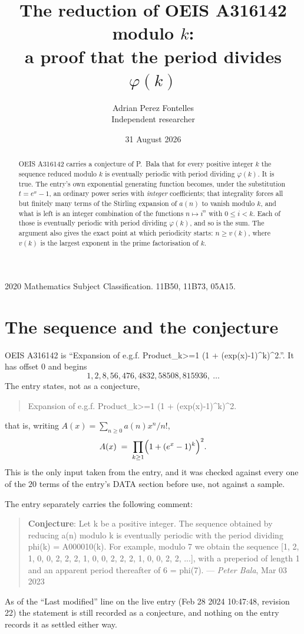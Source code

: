 \documentclass[11pt,a4paper]{article}
\title{The reduction of OEIS A316142 modulo $k$:\\ a proof that the period divides
$\varphi(k)$}
\author{Adrian Perez Fontelles\\ \small Independent researcher}
\date{31 August 2026}
\theoremstyle{plain}
\theoremstyle{definition}
\begin{document}
\maketitle

\begin{abstract}
OEIS A316142 carries a conjecture of P.~Bala that for every positive integer $k$ the
sequence reduced modulo $k$ is eventually periodic with period dividing $\varphi(k)$.
It is true. The entry's own exponential generating function becomes, under the
substitution $t=e^{x}-1$, an ordinary power series with \emph{integer} coefficients;
that integrality forces all but finitely many terms of the Stirling expansion of $a(n)$
to vanish modulo $k$, and what is left is an integer combination of the functions
$n\mapsto i^{n}$ with $0\le i<k$. Each of those is eventually periodic with period
dividing $\varphi(k)$, and so is the sum. The argument also gives the exact point at
which periodicity starts: $n\ge v(k)$, where $v(k)$ is the largest exponent in the
prime factorisation of $k$.
\end{abstract}

\noindent\small 2020 Mathematics Subject Classification. 11B50, 11B73, 05A15.\normalsize

\section{The sequence and the conjecture}

OEIS A316142 is ``Expansion of e.g.f. Product\_{k>=1} (1 + (exp(x)-1)\^{}k)\^{}2.''. It has offset $0$ and begins
\[
1, 2, 8, 56, 476, 4832, 58508, 815936,\ \dots
\]
The entry states, not as a conjecture,
\begin{quote}\small
Expansion of e.g.f. Product\_{k>=1} (1 + (exp(x)-1)\^{}k)\^{}2.
\end{quote}
that is, writing $A(x)=\sum_{n\ge 0}a(n)x^{n}/n!$,
\begin{equation}\label{eq:egf}
A(x)\;=\;\prod_{k\ge 1}\Bigl(1+(e^{x}-1)^{k}\Bigr)^{2}.
\end{equation}
This is the only input taken from the entry, and it was checked against every one of the
$20$ terms of the entry's DATA section before use, not against a sample.

The entry separately carries the following comment:
\begin{quote}\small
\textbf{Conjecture}: Let k be a positive integer. The sequence obtained by reducing a(n) modulo k is eventually periodic with the period dividing phi(k) = A000010(k). For example, modulo 7 we obtain the sequence [1, 2, 1, 0, 0, 2, 2, 2, 1, 0, 0, 2, 2, 2, 1, 0, 0, 2, 2, ...], with a preperiod of length 1 and an apparent period thereafter of 6 = phi(7). --- \emph{Peter Bala}, Mar 03 2023
\end{quote}
As of the ``Last modified'' line on the live entry (Feb 28 2024 10:47:48, revision
22) the statement is still recorded as a conjecture, and nothing on the entry
records it as settled either way.
\end{document}
